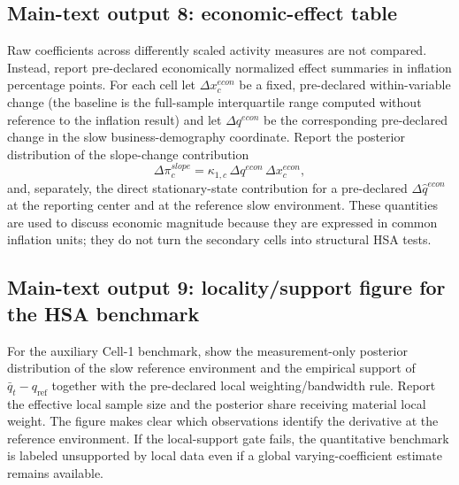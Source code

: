 \documentclass[11pt]{article}
\begin{document}
\subsection{Main-text output 8: economic-effect table}
Raw coefficients across differently scaled activity measures are not compared. Instead, report pre-declared economically normalized effect summaries in inflation percentage points. For each cell let $\Delta x_c^{econ}$ be a fixed, pre-declared within-variable change (the baseline is the full-sample interquartile range computed without reference to the inflation result) and let $\Delta q^{econ}$ be the corresponding pre-declared change in the slow business-demography coordinate. Report the posterior distribution of the slope-change contribution
\begin{equation}
\Delta\pi_{c}^{slope}
=
\kappa_{1,c}\,\Delta q^{econ}\,\Delta x_c^{econ},
\label{eq:economic_slope_effect}
\end{equation}
and, separately, the direct stationary-state contribution for a pre-declared $\Delta\hat q^{econ}$ at the reporting center and at the reference slow environment. These quantities are used to discuss economic magnitude because they are expressed in common inflation units; they do not turn the secondary cells into structural HSA tests.

\subsection{Main-text output 9: locality/support figure for the HSA benchmark}
For the auxiliary Cell-1 benchmark, show the measurement-only posterior distribution of the slow reference environment and the empirical support of $\bar q_t-q_{\mathrm{ref}}$ together with the pre-declared local weighting/bandwidth rule. Report the effective local sample size and the posterior share receiving material local weight. The figure makes clear which observations identify the derivative at the reference environment. If the local-support gate fails, the quantitative benchmark is labeled unsupported by local data even if a global varying-coefficient estimate remains available.
\end{document}
